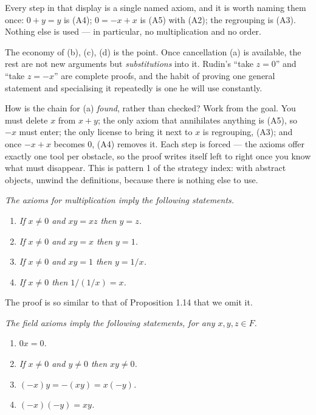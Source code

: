 \begin{unpack}
Every step in that display is a single named axiom, and it is worth naming them
once: $0+y = y$ is (A4); $0 = -x+x$ is (A5) with (A2); the regrouping is (A3).
Nothing else is used --- in particular, no multiplication and no order.

The economy of (b), (c), (d) is the point. Once cancellation (a) is available,
the rest are not new arguments but \emph{substitutions} into it. Rudin's
``take $z = 0$'' and ``take $z = -x$'' are complete proofs, and the habit of
proving one general statement and specialising it repeatedly is one he will use
constantly.

\smallskip
How is the chain for (a) \emph{found}, rather than checked? Work from the
goal. You must delete $x$ from $x+y$; the only axiom that annihilates anything
is (A5), so $-x$ must enter; the only license to bring it next to $x$ is
regrouping, (A3); and once $-x+x$ becomes $0$, (A4) removes it. Each step is
forced --- the axioms offer exactly one tool per obstacle, so the proof writes
itself left to right once you know what must disappear. This is pattern 1 of
the strategy index: with abstract objects, unwind the definitions, because
there is nothing else to use.
\end{unpack}

\emph{The axioms for multiplication imply the following statements.}
\begin{enumerate}[label=(\alph*), leftmargin=2.2em, itemsep=1pt, topsep=3pt]
  \item \emph{If $x \ne 0$ and $xy = xz$ then $y = z$.}
  \item \emph{If $x \ne 0$ and $xy = x$ then $y = 1$.}
  \item \emph{If $x \ne 0$ and $xy = 1$ then $y = 1/x$.}
  \item \emph{If $x \ne 0$ then $1/(1/x) = x$.}
\end{enumerate}
The proof is so similar to that of Proposition 1.14 that we omit it.

\emph{The field axioms imply the following statements, for any $x,y,z \in F$.}
\begin{enumerate}[label=(\alph*), leftmargin=2.2em, itemsep=1pt, topsep=3pt]
  \item \emph{$0x = 0$.}
  \item \emph{If $x \ne 0$ and $y \ne 0$ then $xy \ne 0$.}
  \item \emph{$(-x)y = -(xy) = x(-y)$.}
  \item \emph{$(-x)(-y) = xy$.}
\end{enumerate}

